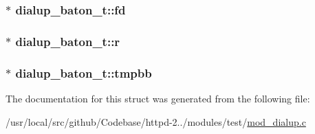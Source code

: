 \subsubsection[{\texorpdfstring{fd}{fd}}]{$\ast$ dialup\+\_\+baton\+\_\+t\+::fd}\hypertarget{structdialup__baton__t_a3071ed66c795266e02c550ddf7131ce2}{}\label{structdialup__baton__t_a3071ed66c795266e02c550ddf7131ce2}
\subsubsection[{\texorpdfstring{r}{r}}]{$\ast$ dialup\+\_\+baton\+\_\+t\+::r}\hypertarget{structdialup__baton__t_a63966e215229e8b9b825b45be0646a75}{}\label{structdialup__baton__t_a63966e215229e8b9b825b45be0646a75}
\subsubsection[{\texorpdfstring{tmpbb}{tmpbb}}]{$\ast$ dialup\+\_\+baton\+\_\+t\+::tmpbb}\hypertarget{structdialup__baton__t_af80379b2b8174ab9c59fe53783d21883}{}\label{structdialup__baton__t_af80379b2b8174ab9c59fe53783d21883}


The documentation for this struct was generated from the following file\+:\begin{DoxyCompactItemize}
\item 
/usr/local/src/github/\+Codebase/httpd-\/2../modules/test/\hyperlink{mod__dialup_8c}{mod\+\_\+dialup.\+c}\end{DoxyCompactItemize}
